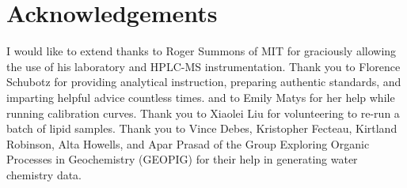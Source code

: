 

\section{Acknowledgements} I would like to extend thanks to Roger Summons of MIT for graciously allowing the use of his laboratory and HPLC-MS instrumentation. Thank you to Florence Schubotz for providing analytical instruction, preparing authentic standards, and imparting helpful advice countless times. and to Emily Matys for her help while running calibration curves. Thank you to Xiaolei Liu for volunteering to re-run a batch of lipid samples. Thank you to Vince Debes, Kristopher Fecteau, Kirtland Robinson, Alta Howells, and Apar Prasad of the Group Exploring Organic Processes in Geochemistry (GEOPIG) for their help in generating water chemistry data.